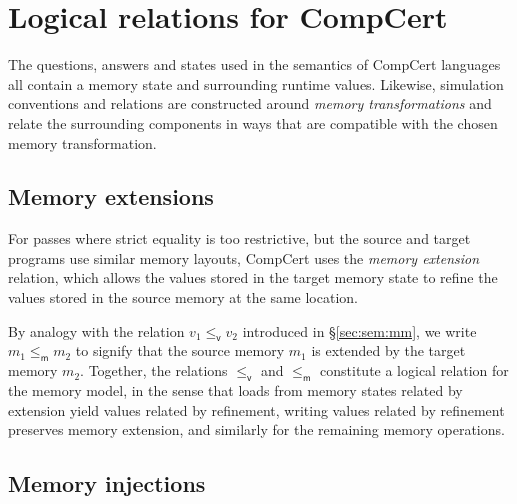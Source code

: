 \documentclass[sigplan,10pt,review]{acmart}
\newcommand{\kw}[1]{\ensuremath{ \mathsf{#1} }}
\newcommand{\vref}{\le_\kw{v}}
\newcommand{\mext}{\le_\kw{m}}
\begin{document}


\section{Logical relations for CompCert} \label{sec:cklr} %


The questions, answers and states
used in the semantics of CompCert languages all contain
a memory state and surrounding runtime values.
Likewise, simulation conventions and relations
are constructed around \emph{memory transformations}
and relate the surrounding components in ways that %
are compatible with the chosen memory transformation.

\subsection{Memory extensions} \label{sec:memext} %

For passes where strict equality is too restrictive,
but the source and target programs
use similar memory layouts,
CompCert uses the \emph{memory extension} relation,
which allows the values
stored in the target memory state to refine
the values stored in the source memory at the same location.

By analogy with
the relation $v_1 \vref v_2$
introduced in
\S\ref{sec:sem:mm},
we write $m_1 \mext m_2$ to signify that
the source memory $m_1$ is extended by
the target memory $m_2$.
Together,
the relations $\vref$ and $\mext$
constitute a logical relation for the memory model,
in the sense that
loads from memory states related by extension
yield values related by refinement,
writing values related by refinement
preserves memory extension,
and similarly for the remaining memory operations.


\subsection{Memory injections} \label{sec:meminj} %
\end{document}
